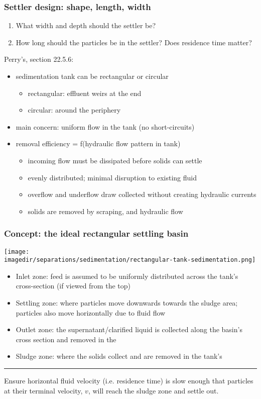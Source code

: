 \begin{frame}\frametitle{Settler design: shape, length, width}
	\begin{enumerate}
		\item	What width and depth should the settler be?
		\item	How long should the particles be in the settler? Does residence time matter?
	\end{enumerate}

	Perry's, section 22.5.6:
	\begin{itemize}
		\item	sedimentation tank can be rectangular or circular
		\begin{itemize}
			\item	rectangular: effluent weirs at the end
			\item	circular: around the periphery
		\end{itemize}
		\item	main concern: uniform flow in the tank (no short-circuits)
		\item	removal efficiency = f(hydraulic flow pattern in tank)
		\begin{itemize}
			\item	incoming flow must be dissipated before solids can settle
			\item	evenly distributed; minimal disruption to existing fluid
			\item	overflow and underflow draw collected without creating hydraulic currents
			\item	solids are removed by scraping, and hydraulic flow
		\end{itemize}
	\end{itemize}
\end{frame}

\begin{frame}\frametitle{Concept: the ideal rectangular settling basin}
	\begin{center}
		\texttt{[image: \\imagedir/separations/sedimentation/rectangular-tank-sedimentation.png]}
	\end{center}
	{\scriptsize
	\begin{itemize}
		\item	Inlet zone: feed is assumed to be uniformly distributed across the tank's cross-section (if viewed from the top)
		\item	Settling zone: where particles move downwards towards the sludge area; particles also move horizontally due to fluid flow
		\item	Outlet zone: the supernatant/clarified liquid is collected along the basin's cross section and removed in the {}
		\item	Sludge zone: where the solids collect and are removed in the tank's {}
	\end{itemize}
	}
	\hrule
	Ensure horizontal fluid velocity (i.e. residence time) is slow enough that particles at their terminal velocity, $v$, will reach the sludge zone and settle out.
\end{frame}

